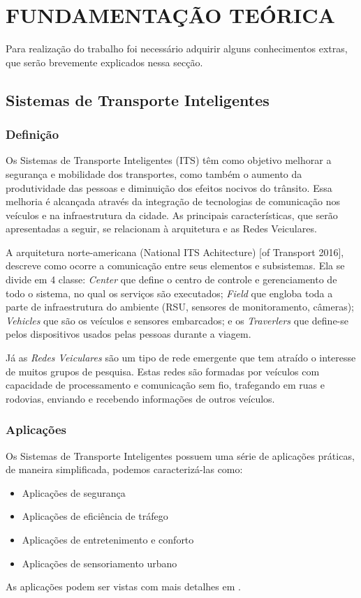 \section{FUNDAMENTAÇÃO TEÓRICA}
Para realização do trabalho foi necessário adquirir alguns conhecimentos extras, que serão brevemente explicados nessa secção.

\subsection{Sistemas de Transporte Inteligentes}
    \subsubsection{Definição}
        Os Sistemas de Transporte Inteligentes (ITS) têm como objetivo melhorar a segurança e mobilidade dos transportes, como também o aumento da produtividade das pessoas e diminuição dos efeitos nocivos do trânsito. Essa melhoria é alcançada através da integração de tecnologias de comunicação nos veículos e na infraestrutura da cidade. As principais características, que serão apresentadas a seguir, se relacionam à arquitetura e as Redes Veiculares.
        
        A arquitetura norte-americana (National ITS Achitecture) [of Transport 2016], descreve como ocorre a comunicação entre seus elementos e subsistemas. Ela se divide em 4 classe: \emph{Center} que define o centro de controle e gerenciamento de todo o sistema, no qual os serviços são executados; \emph{Field} que engloba toda a parte de infraestrutura do ambiente (RSU, sensores de monitoramento, câmeras); \emph{Vehicles} que são os veículos e sensores embarcados; e os \emph{Traverlers} que define-se pelos dispositivos usados pelas pessoas durante a viagem. 
        
        Já as \emph{Redes Veiculares} são um tipo de rede emergente que tem atraído o interesse de muitos grupos de pesquisa. Estas redes são formadas por veículos com capacidade de processamento e comunicação sem fio, trafegando em ruas e rodovias, enviando e recebendo informações de outros veículos. 
        
    \subsubsection{Aplicações}
        Os Sistemas de Transporte Inteligentes possuem uma série de aplicações práticas, de maneira simplificada, podemos caracterizá-las como:
        \begin{itemize}
            \item Aplicações de segurança
            \item Aplicações de eficiência de tráfego
            \item Aplicações de entretenimento e conforto
            \item Aplicações de sensoriamento urbano
        \end{itemize}
        As aplicações podem ser vistas com mais detalhes em \cite{165839}.
        

